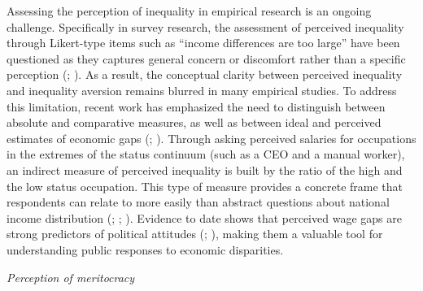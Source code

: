 \documentclass[
  12pt,
]{article}
\begin{document}
Assessing the perception of inequality in empirical research is an
ongoing challenge. Specifically in survey research, the assessment of
perceived inequality through Likert-type items such as ``income
differences are too large'' have been questioned as they captures
general concern or discomfort rather than a specific perception
(;
). As a result, the conceptual clarity between perceived inequality
and inequality aversion remains blurred in many empirical studies. To
address this limitation, recent work has emphasized the need to
distinguish between absolute and comparative measures, as well as
between ideal and perceived estimates of economic gaps
(;
). Through asking perceived salaries for occupations in
the extremes of the status continuum (such as a CEO and a manual
worker), an indirect measure of perceived inequality is built by the
ratio of the high and the low status occupation. This type of measure
provides a concrete frame that respondents can relate to more easily
than abstract questions about national income distribution
(;
;
). Evidence to
date shows that perceived wage gaps are strong predictors of political
attitudes (; ), making them a valuable tool for understanding public responses
to economic disparities.

\emph{Perception of meritocracy}
\end{document}

